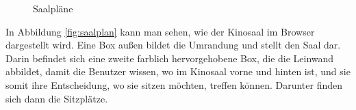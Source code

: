 \begin{figure}[ht]
	\centering
	\hfill

	\caption{Saalpläne}
	\label{fig:saalplan}
\end{figure}

In Abbildung \vref{fig:saalplan} kann man sehen, wie der Kinosaal im Browser dargestellt wird.
Eine Box außen bildet die Umrandung und stellt den Saal dar.
Darin befindet sich eine zweite farblich hervorgehobene Box, die die Leinwand abbildet, damit die Benutzer wissen, wo im Kinosaal vorne und hinten ist, und sie somit ihre Entscheidung, wo sie sitzen möchten, treffen können.
Darunter finden sich dann die Sitzplätze.

